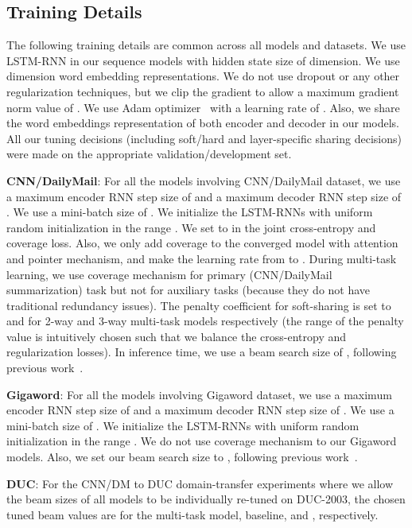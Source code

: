 \documentclass[11pt,a4paper]{article}
\begin{document}
 
 



\subsection{Training Details}
The following training details are common across all models and datasets. 
We use LSTM-RNN in our sequence models with hidden state size of  dimension. We use  dimension word embedding representations. We do not use dropout or any other regularization techniques, but we clip the gradient to allow a maximum gradient norm value of .
We use Adam optimizer~\cite{kingma2014adam} with a learning rate of .
Also, we share the word embeddings representation of both encoder and decoder in our models. All our tuning decisions (including soft/hard and layer-specific sharing decisions) were made on the appropriate validation/development set.

\noindent\textbf{CNN/DailyMail}: For all the models involving CNN/DailyMail dataset, we use a maximum encoder RNN step size of  and a maximum decoder RNN step size of . We use a mini-batch size of . We initialize the LSTM-RNNs with uniform random initialization in the range . We set  to  in the joint cross-entropy and coverage loss. Also, we only add coverage to the converged model with attention and pointer mechanism, and make the learning rate from  to . During multi-task learning, we use coverage mechanism for primary (CNN/DailyMail summarization) task but not for auxiliary tasks (because they do not have traditional redundancy issues). The penalty coefficient  for soft-sharing is set to  and  for 2-way and 3-way multi-task models respectively (the range of the penalty value is intuitively chosen such that we balance the cross-entropy and regularization losses). 
In inference time, we use a beam search size of , following previous work~\cite{see2017get}. 

\noindent\textbf{Gigaword}: For all the models involving Gigaword dataset, we use a maximum encoder RNN step size of  and a maximum decoder RNN step size of . We use a mini-batch size of . We initialize the LSTM-RNNs with uniform random initialization in the range . We do not use coverage mechanism to our Gigaword models. Also, we set our beam search size to , following previous work~\cite{nallapati2016abstractive}.

\noindent\textbf{DUC}: For the CNN/DM to DUC domain-transfer experiments where we allow the beam sizes of all models to be individually re-tuned on DUC-2003, the chosen tuned beam values are  for the multi-task model, baseline, and , respectively.
\end{document}
